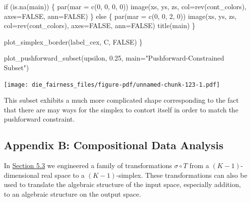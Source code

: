 \documentclass[
  letterpaper,
  DIV=11,
  numbers=noendperiod]{scrartcl}
\newenvironment{Shaded}{\begin{snugshade}}{\end{snugshade}}
\newcommand{\AttributeTok}[1]{\textcolor[rgb]{0.40,0.45,0.13}{#1}}
\newcommand{\ConstantTok}[1]{\textcolor[rgb]{0.56,0.35,0.01}{#1}}
\newcommand{\ControlFlowTok}[1]{\textcolor[rgb]{0.00,0.23,0.31}{#1}}
\newcommand{\DecValTok}[1]{\textcolor[rgb]{0.68,0.00,0.00}{#1}}
\newcommand{\FloatTok}[1]{\textcolor[rgb]{0.68,0.00,0.00}{#1}}
\newcommand{\FunctionTok}[1]{\textcolor[rgb]{0.28,0.35,0.67}{#1}}
\newcommand{\NormalTok}[1]{\textcolor[rgb]{0.00,0.23,0.31}{#1}}
\newcommand{\StringTok}[1]{\textcolor[rgb]{0.13,0.47,0.30}{#1}}
\begin{document}
\begin{Shaded}
\begin{Highlighting}[]
  \ControlFlowTok{if}\NormalTok{ (}\FunctionTok{is.na}\NormalTok{(main)) \{}
    \FunctionTok{par}\NormalTok{(}\AttributeTok{mar =} \FunctionTok{c}\NormalTok{(}\DecValTok{0}\NormalTok{, }\DecValTok{0}\NormalTok{, }\DecValTok{0}\NormalTok{, }\DecValTok{0}\NormalTok{))}
    \FunctionTok{image}\NormalTok{(xs, ys, zs, }\AttributeTok{col=}\FunctionTok{rev}\NormalTok{(cont\_colors), }\AttributeTok{axes=}\ConstantTok{FALSE}\NormalTok{, }\AttributeTok{ann=}\ConstantTok{FALSE}\NormalTok{)}
\NormalTok{  \} }\ControlFlowTok{else}\NormalTok{ \{}
    \FunctionTok{par}\NormalTok{(}\AttributeTok{mar =} \FunctionTok{c}\NormalTok{(}\DecValTok{0}\NormalTok{, }\DecValTok{0}\NormalTok{, }\DecValTok{2}\NormalTok{, }\DecValTok{0}\NormalTok{))}
    \FunctionTok{image}\NormalTok{(xs, ys, zs, }\AttributeTok{col=}\FunctionTok{rev}\NormalTok{(cont\_colors), }\AttributeTok{axes=}\ConstantTok{FALSE}\NormalTok{, }\AttributeTok{ann=}\ConstantTok{FALSE}\NormalTok{)}
    \FunctionTok{title}\NormalTok{(main)}
\NormalTok{  \}}

  \FunctionTok{plot\_simplex\_border}\NormalTok{(label\_cex, C, }\ConstantTok{FALSE}\NormalTok{)}
\NormalTok{\}}
\end{Highlighting}
\end{Shaded}

\begin{Shaded}
\begin{Highlighting}[]
\FunctionTok{plot\_pushforward\_subset}\NormalTok{(upsilon, }\FloatTok{0.25}\NormalTok{, }\AttributeTok{main=}\StringTok{"Pushforward{-}Constrained Subset"}\NormalTok{)}
\end{Highlighting}
\end{Shaded}

\texttt{[image: die\_fairness\_files/figure-pdf/unnamed-chunk-123-1.pdf]}

This subset exhibits a much more complicated shape corresponding to the
fact that there are may ways for the simplex to contort itself in order
to match the pushforward constraint.

\subsection*{Appendix B: Compositional Data
Analysis}\label{sec:appendixb}

In \href{@sec:transformedpop}{Section 5.3} we engineered a family of
transformations \(\sigma \circ T\) from a \((K - 1)\)-dimensional real
space to a \((K - 1)\)-simplex. These transformations can also be used
to translate the algebraic structure of the input space, especially
addition, to an algebraic structure on the output space.
\end{document}
